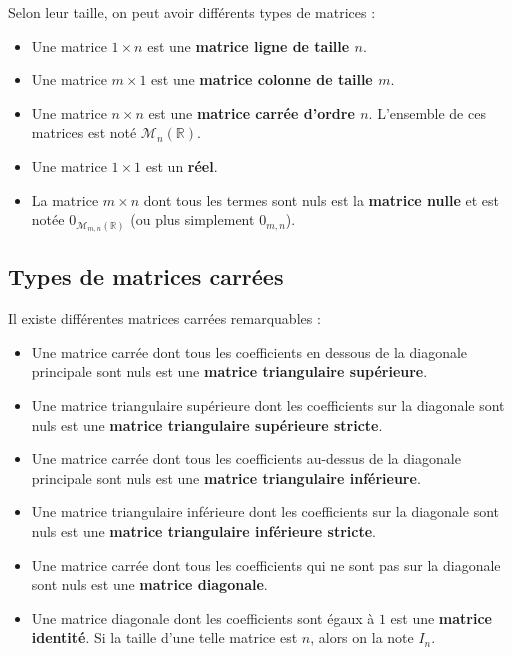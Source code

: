 	\begin{formula}
		Selon leur taille, on peut avoir différents types de matrices :
		\begin{itemize}
			\item Une matrice $1 \times n$ est une \textbf{matrice ligne de taille $n$}.
			\item Une matrice $m \times 1$ est une \textbf{matrice colonne de taille $m$}.
			\item Une matrice $n \times n$ est une \textbf{matrice carrée d'ordre $n$}. L'ensemble de ces matrices est noté $\mathcal{M}_n(\mathbb{R})$.
			\item Une matrice $1 \times 1$ est un \textbf{réel}.
			\item La matrice $m \times n$ dont tous les termes sont nuls est la \textbf{matrice nulle} et est notée $0_{\mathcal{M}_{m,n}(\mathbb{R})}$ (ou plus simplement $0_{m,n}$).
		\end{itemize}
	\end{formula}

	\subsection{Types de matrices carrées}

	\begin{formula}
		Il existe différentes matrices carrées remarquables :
		\begin{itemize}
			\item Une matrice carrée dont tous les coefficients en dessous de la diagonale principale sont nuls est une \textbf{matrice triangulaire supérieure}.
			\item Une matrice triangulaire supérieure dont les coefficients sur la diagonale sont nuls est une \textbf{matrice triangulaire supérieure stricte}.
			\item Une matrice carrée dont tous les coefficients au-dessus de la diagonale principale sont nuls est une \textbf{matrice triangulaire inférieure}.
			\item Une matrice triangulaire inférieure dont les coefficients sur la diagonale sont nuls est une \textbf{matrice triangulaire inférieure stricte}.
			\item Une matrice carrée dont tous les coefficients qui ne sont pas sur la diagonale sont nuls est une \textbf{matrice diagonale}.
			\item Une matrice diagonale dont les coefficients sont égaux à $1$ est une \textbf{matrice identité}. Si la taille d'une telle matrice est $n$, alors on la note $I_n$.
		\end{itemize}
	\end{formula}


